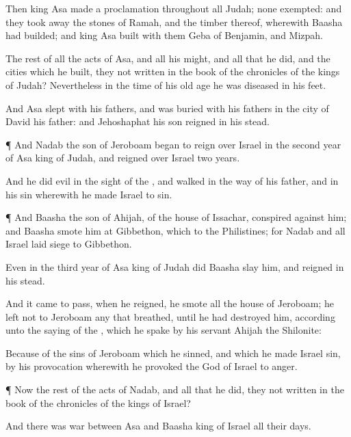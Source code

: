 {Then
king
Asa made a
proclamation throughout all
Judah; none
{}
exempted: and they
took away the
stones of
Ramah, and the
timber thereof, wherewith
Baasha had
builded; and
king
Asa
built with them
Geba of
Benjamin, and
Mizpah.

The
rest of all the
acts of
Asa, and all his
might, and all that he
did, and the
cities which he
built,
{} they not
written in the
book of the
chronicles of the
kings of
Judah? Nevertheless in the
time of his old
age he was
diseased in his
feet.

And
Asa
slept with his
fathers, and was
buried with his
fathers in the
city of
David his
father: and
Jehoshaphat his
son
reigned in his stead.


\par }{\PP {}¶ And
Nadab the
son of
Jeroboam began to
reign over
Israel in the
second
year of
Asa
king of
Judah, and
reigned over
Israel
two
years.

And he
did
evil in the
sight of the
{}, and
walked in the
way of his
father, and in his
sin wherewith he made
Israel to
sin.


\par }{\PP {}¶ And
Baasha the
son of
Ahijah, of the
house of
Issachar,
conspired against him; and
Baasha
smote him at
Gibbethon, which
{} to the
Philistines; for
Nadab and all
Israel laid
siege to
Gibbethon.

Even in the
third
year of
Asa
king of
Judah did
Baasha
slay him, and
reigned in his stead.

And it came to pass, when he
reigned,
{} he
smote all the
house of
Jeroboam; he
left not to
Jeroboam any that
breathed, until he had
destroyed him, according unto the
saying of the
{}, which he
spake
by his
servant
Ahijah the
Shilonite:

Because of the
sins of
Jeroboam which he
sinned, and which he made
Israel
sin, by his
provocation wherewith he provoked the
{}
God of
Israel to
anger.


\par }{\PP {}¶ Now the
rest of the
acts of
Nadab, and all that he
did,
{} they not
written in the
book of the
chronicles of the
kings of
Israel?

And there was
war between
Asa and
Baasha
king of
Israel all their
days.

}
